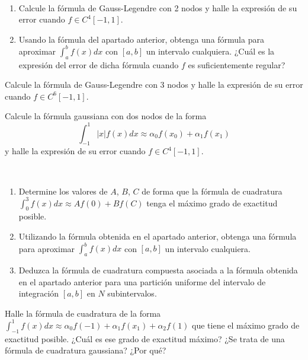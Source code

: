 \begin{ejercicio}\label{ej:2.1.23}~
    \begin{enumerate}
        \item Calcule la fórmula de Gauss-Legendre con 2 nodos y halle la expresión de su error cuando $f \in C^4[-1, 1]$.
        \item Usando la fórmula del apartado anterior, obtenga una fórmula para aproximar $\int_{a}^{b} f(x) dx$ con $[a, b]$ un intervalo cualquiera. ¿Cuál es la expresión del error de dicha fórmula cuando $f$ es suficientemente regular?
    \end{enumerate}
\end{ejercicio}

\begin{ejercicio}\label{ej:2.1.24}
    Calcule la fórmula de Gauss-Legendre con 3 nodos y halle la expresión de su error cuando $f \in C^6[-1, 1]$.
\end{ejercicio}

\begin{ejercicio}\label{ej:2.1.25}
    Calcule la fórmula gaussiana con dos nodos de la forma $$\int_{-1}^{1} |x|f(x) dx \approx \alpha_0 f(x_0) + \alpha_1 f(x_1)$$ y halle la expresión de su error cuando $f \in C^4[-1, 1]$.
\end{ejercicio}

\begin{ejercicio}\label{ej:2.1.26}~
    \begin{enumerate}
        \item Determine los valores de $A$, $B$, $C$ de forma que la fórmula de cuadratura $\int_{0}^{3} f(x) dx \approx Af(0) + Bf(C)$ tenga el máximo grado de exactitud posible.
        \item Utilizando la fórmula obtenida en el apartado anterior, obtenga una fórmula para aproximar $\int_{a}^{b} f(x) dx$ con $[a, b]$ un intervalo cualquiera.
        \item Deduzca la fórmula de cuadratura compuesta asociada a la fórmula obtenida en el apartado anterior para una partición uniforme del intervalo de integración $[a, b]$ en $N$ subintervalos.
    \end{enumerate}
\end{ejercicio}

\begin{ejercicio}\label{ej:2.1.27}
    Halle la fórmula de cuadratura de la forma $\int_{-1}^{1} f(x) dx \approx \alpha_0 f(-1) + \alpha_1 f(x_1) + \alpha_2 f(1)$ que tiene el máximo grado de exactitud posible. ¿Cuál es ese grado de exactitud máximo? ¿Se trata de una fórmula de cuadratura gaussiana? ¿Por qué?
\end{ejercicio}

